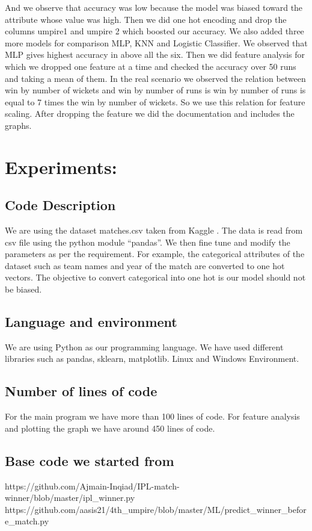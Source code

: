 \documentclass[12pt, a4paper]{article}
\begin{document}
And we observe that accuracy was low because the model was biased toward the attribute whose value was high. Then we did one hot encoding and drop the columns umpire1 and umpire 2 which boosted our accuracy.
We also added three more models for comparison MLP, KNN and Logistic Classifier. We observed that MLP gives highest accuracy in above all the six.
Then we did feature analysis for which we dropped one feature at a time and checked the accuracy over 50 runs and taking a mean of them. In the real scenario we observed the relation between win by number of wickets and win by number of runs is win by number of runs is equal to 7 times the win by number of wickets. So we use this relation for feature scaling.  
After dropping the feature we did the documentation and includes the graphs.  

 \newpage
\section{\textbf{Experiments:}}
\subsection{\textbf{Code Description}}
We are using the dataset matches.csv taken from Kaggle . The data is read from csv file using the python module “pandas”. We then fine tune and modify the parameters as per the requirement. For example, the categorical attributes of the dataset such as team names and year of the match are converted to one hot vectors. The objective to convert categorical into one hot is our model should not be biased.
\subsection{\textbf{Language and environment}}
We are using Python as our programming language. We have used different libraries such as pandas, sklearn, matplotlib. Linux and Windows Environment.  
\subsection{\textbf{Number of lines of code}}
For the main program we have more than 100 lines of code. For feature analysis and plotting the graph we have around 450 lines of code.
\subsection{\textbf{Base code we started from}}
 https://github.com/Ajmain-Inqiad/IPL-match-winner/blob/master/ipl_winner.py\\
 https://github.com/aasis21/4th_umpire/blob/master/ML/predict_winner_before_match.py\\
\end{document}
